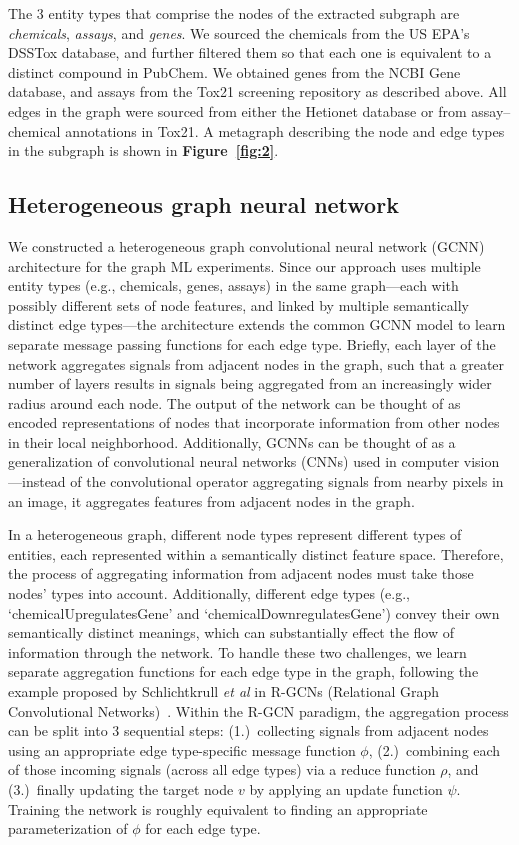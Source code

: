 \documentclass{ws-procs11x85}
\begin{document}
The 3 entity types that comprise the nodes of the extracted subgraph are \textit{chemicals}, \textit{assays}, and \textit{genes}.
We sourced the chemicals from the US EPA's DSSTox database, and further filtered them so that each one is equivalent to a distinct compound in PubChem.
We obtained genes from the NCBI Gene database, and assays from the Tox21 screening repository as described above.
All edges in the graph were sourced from either the Hetionet database or from assay--chemical annotations in Tox21.
A metagraph describing the node and edge types in the subgraph is shown in \textbf{Figure~\ref{fig:2}}.

\subsection{Heterogeneous graph neural network}
We constructed a heterogeneous graph convolutional neural network (GCNN) architecture for the graph ML experiments.
Since our approach uses multiple entity types (e.g., chemicals, genes, assays) in the same graph---each with possibly different sets of node features, and linked by multiple semantically distinct edge types---the architecture extends the common GCNN model to learn separate message passing functions for each edge type.
Briefly, each layer of the network aggregates signals from adjacent nodes in the graph, such that a greater number of layers results in signals being aggregated from an increasingly wider radius around each node.
The output of the network can be thought of as encoded representations of nodes that incorporate information from other nodes in their local neighborhood.
Additionally, GCNNs can be thought of as a generalization of convolutional neural networks (CNNs) used in computer vision---instead of the convolutional operator aggregating signals from nearby pixels in an image, it aggregates features from adjacent nodes in the graph.

In a heterogeneous graph, different node types represent different types of entities, each represented within a semantically distinct feature space.
Therefore, the process of aggregating information from adjacent nodes must take those nodes' types into account.
Additionally, different edge types (e.g., `chemicalUpregulatesGene' and `chemicalDownregulatesGene') convey their own semantically distinct meanings, which can substantially effect the flow of information through the network.
To handle these two challenges, we learn separate aggregation functions for each edge type in the graph, following the example proposed by Schlichtkrull \textit{et al} in R-GCNs (Relational Graph Convolutional Networks)~\cite{schlichtkrull2018modeling}.
Within the R-GCN paradigm, the aggregation process can be split into 3 sequential steps: (1.)~collecting signals from adjacent nodes using an appropriate edge type-specific message function $\phi$, (2.)~combining each of those incoming signals (across all edge types) via a reduce function $\rho$, and (3.)~finally updating the target node $v$ by applying an update function $\psi$.
Training the network is roughly equivalent to finding an appropriate parameterization of $\phi$ for each edge type.
\end{document}

